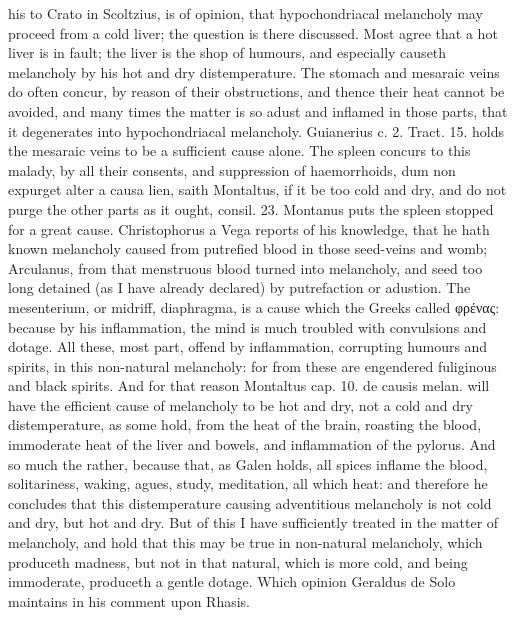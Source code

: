 {his to Crato in Scoltzius, is of opinion, that hypochondriacal
melancholy may proceed from a cold liver; the question is there
discussed. Most agree that a hot liver is in fault; the liver is
the shop of humours, and especially causeth melancholy by his hot and
dry distemperature. The stomach and mesaraic veins do often
concur, by reason of their obstructions, and thence their heat cannot
be avoided, and many times the matter is so adust and inflamed in those
parts, that it degenerates into hypochondriacal melancholy. Guianerius
c. 2. Tract. 15. holds the mesaraic veins to be a sufficient
cause alone. The spleen concurs to this malady, by all their
consents, and suppression of haemorrhoids, dum non expurget alter a
causa lien, saith Montaltus, if it be too cold and dry, and do
not purge the other parts as it ought, consil. 23. Montanus puts the
 spleen stopped for a great cause. Christophorus a Vega
reports of his knowledge, that he hath known melancholy caused from
putrefied blood in those seed-veins and womb; Arculanus, from
that menstruous blood turned into melancholy, and seed too long
detained (as I have already declared) by putrefaction or adustion.
The mesenterium, or midriff, diaphragma, is a cause which the
Greeks called \textgreek{φρένας}: because by his inflammation, the mind is
much troubled with convulsions and dotage. All these, most part, offend
by inflammation, corrupting humours and spirits, in this non-natural
melancholy: for from these are engendered fuliginous and black spirits.
And for that reason Montaltus cap. 10. de causis melan. will have
the efficient cause of melancholy to be hot and dry, not a cold and dry
distemperature, as some hold, from the heat of the brain, roasting the
blood, immoderate heat of the liver and bowels, and inflammation of the
pylorus. And so much the rather, because that, as Galen holds, all
spices inflame the blood, solitariness, waking, agues, study,
meditation, all which heat: and therefore he concludes that this
distemperature causing adventitious melancholy is not cold and dry, but
hot and dry. But of this I have sufficiently treated in the matter of
melancholy, and hold that this may be true in non-natural melancholy,
which produceth madness, but not in that natural, which is more cold,
and being immoderate, produceth a gentle dotage. Which opinion
Geraldus de Solo maintains in his comment upon Rhasis.

}
